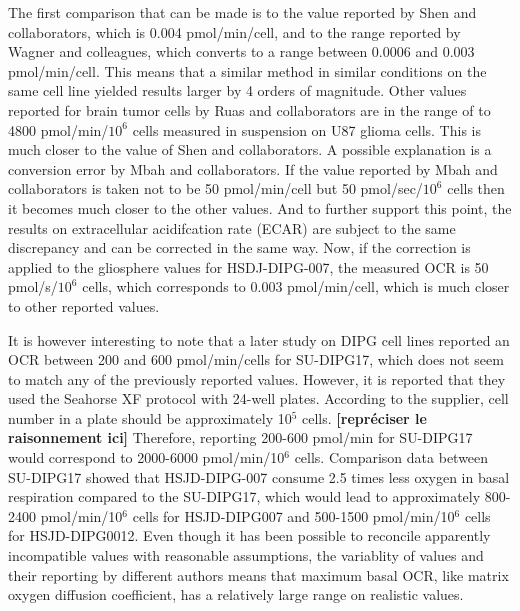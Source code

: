 \documentclass[11pt,a4paper]{article}
\begin{document}
The first comparison that can be made is to the value reported by Shen and collaborators, which is 0.004 pmol/min/cell, and to the range reported by Wagner and colleagues, which converts to a range between 0.0006 and 0.003 pmol/min/cell. This means that a similar method in similar conditions on the same cell line yielded results larger by 4 orders of magnitude. Other values reported for brain tumor cells by Ruas and collaborators are in the range of  to 4800 pmol/min/$10^6$ cells measured in suspension on U87 glioma cells.\cite{Ruas2018} This is much closer to the value of Shen and collaborators. A possible explanation is a conversion error by Mbah and collaborators. If the value reported by Mbah and collaborators is taken not to be 50 pmol/min/cell but 50 pmol/sec/$10^6$ cells then it becomes much closer to the other values. And to further support this point, the results on extracellular acidifcation rate (ECAR) are subject to the same discrepancy and can be corrected in the same way. Now, if the correction is applied to the gliosphere values for HSDJ-DIPG-007, the measured OCR is 50 pmol/s/$10^6$ cells, which corresponds to 0.003 pmol/min/cell, which is much closer to other reported values. 

It is however interesting to note that a later study on DIPG cell lines reported an OCR between 200 and 600 pmol/min/cells for SU-DIPG17, which does not seem to match any of the previously reported values.\cite{Shen2024} However, it is reported that they used the Seahorse XF protocol with 24-well plates. According to the supplier, cell number in a plate should be approximately 10$^5$ cells. \textbf{[repréciser le raisonnement ici] }Therefore, reporting 200-600 pmol/min for SU-DIPG17 would correspond to 2000-6000 pmol/min/10$^6$ cells. Comparison data between SU-DIPG17 showed that HSJD-DIPG-007 consume 2.5 times less oxygen in basal respiration compared to the SU-DIPG17, which would lead to approximately 800-2400 pmol/min/10$^6$ cells for HSJD-DIPG007 and 500-1500 pmol/min/10$^6$ cells for HSJD-DIPG0012. Even though it has been possible to reconcile apparently incompatible values with reasonable assumptions, the variablity of values and their reporting by different authors means that maximum basal OCR, like matrix oxygen diffusion coefficient, has a relatively large range on realistic values.
\end{document}
